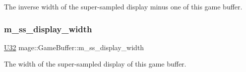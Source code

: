The inverse width of the super-\/sampled display minus one of this game buffer. \hypertarget{structmage_1_1_game_buffer_a5571b4b908c0e25083d3b8949d1c7706}{}\label{structmage_1_1_game_buffer_a5571b4b908c0e25083d3b8949d1c7706} 
\subsubsection{\texorpdfstring{m\+\_\+ss\+\_\+display\+\_\+width}{m\_ss\_display\_width}}
{\footnotesize\ttfamily \hyperlink{namespacemage_a41c104c036fba3756a74e19f793eeaa1}{U32} mage\+::\+Game\+Buffer\+::m\+\_\+ss\+\_\+display\+\_\+width}

The width of the super-\/sampled display of this game buffer. 